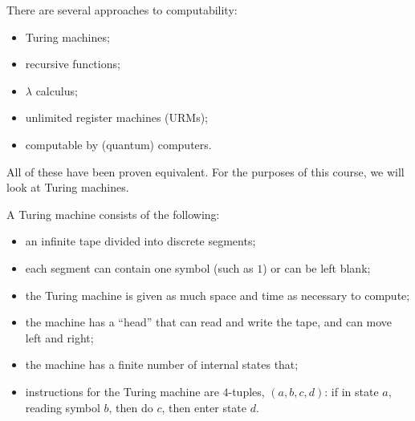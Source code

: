\documentclass[10pt]{mypackage}
\begin{document}
There are several approaches to computability:
\begin{itemize}
  \item Turing machines;
  \item recursive functions;
  \item $\lambda$ calculus;
  \item unlimited register machines (URMs);
  \item computable by (quantum) computers.
\end{itemize}
All of these have been proven equivalent. For the purposes of this course, we will look at Turing machines.
\begin{definition}
A Turing machine consists of the following:
\begin{itemize}
  \item an infinite tape divided into discrete segments;
  \item each segment can contain one symbol (such as $1$) or can be left blank;
  \item the Turing machine is given as much space and time as necessary to compute;
  \item the machine has a ``head'' that can read and write the tape, and can move left and right;
  \item the machine has a finite number of internal states that;
  \item instructions for the Turing machine are $4$-tuples, $\left(a,b,c,d\right)$: if in state $a$, reading symbol $b$, then do $c$, then enter state $d$.
\end{itemize}
\end{definition}
\end{document}
